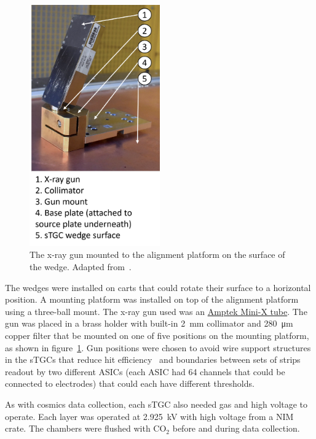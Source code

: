 \begin{figure}
    \centering
    \includegraphics[width = 0.5\textwidth]{figures/figure_xray_setup.pdf}
    \caption{The x-ray gun mounted to the alignment platform on the surface of the wedge. Adapted from~\cite{lefebvre_precision_2020}.}
    \label{fig:xray_setup}
\end{figure}

The wedges were installed on carts that could rotate their surface to a horizontal position. A mounting platform was installed on top of the alignment platform using a three-ball mount. The x-ray gun used was an \href{https://www.amptek.com/-/media/ametekamptek/documents/resources/specs/mini-x-specifications.pdf?la=en\&revision=512f7eb3-01b3-47fd-864f-5525c850fc6e\&hash=B8B03C0592486E2D91C566C4326F15F5}{Amptek Mini-X tube}. The gun was placed in a brass holder with built-in \SI{2}{mm} collimator and \SI{280}{\micro\meter} copper filter that be mounted on one of five positions on the mounting platform, as shown in figure~\ref{fig:xray_setup}. Gun positions were chosen to avoid wire support structures in the sTGCs that reduce hit efficiency~\cite{lefebvre_thesis} and boundaries between sets of strips readout by two different ASICs (each ASIC had 64 channels that could be connected to electrodes) that could each have different thresholds. 

As with cosmics data collection, each sTGC also needed gas and high voltage to operate. Each layer was operated at \SI{2.925}{kV} with high voltage from a NIM crate. The chambers were flushed with CO$_2$ before and during data collection.

